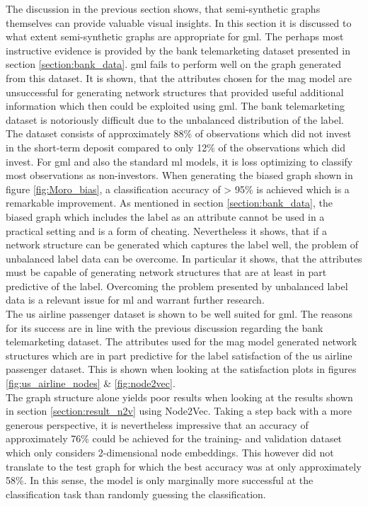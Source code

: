  The discussion in the previous section shows, that semi-synthetic graphs
  themselves can provide valuable visual insights. In this section it is
  discussed to what extent semi-synthetic graphs are appropriate for \acs{gml}. 
  The perhaps most instructive evidence is provided by the bank telemarketing 
  dataset presented in section \ref{section:bank_data}. \acs{gml} fails to 
  perform well on the graph generated from this dataset. It is shown, that the 
  attributes chosen for the \acs{mag} model are unsuccessful for generating 
  network structures that provided useful additional information which then 
  could be exploited using \acs{gml}. The bank telemarketing dataset is 
  notoriously difficult due to the unbalanced distribution of the label. The 
  dataset consists of approximately 88\% of observations which did not invest 
  in the short-term deposit compared to only 12\% of the observations which did 
  invest. For \acs{gml} and also the standard \acs{ml} models, it is loss 
  optimizing to classify most observations as non-investors. When generating 
  the biased graph shown in figure \ref{fig:Moro_bias}, a classification 
  accuracy of > 95\% is achieved which is a remarkable improvement. As 
  mentioned in section \ref{section:bank_data}, the biased graph which includes 
  the label as an attribute cannot be used in a practical setting and is a form of
  cheating. Nevertheless it shows, that if a network structure can be generated
  which captures the label well, the problem of unbalanced label data can be
  overcome. In particular it shows, that the attributes must be capable of
  generating network structures that are at least in part predictive of the
  label. Overcoming the problem presented by unbalanced label data is a relevant 
  issue for \acs{ml} and warrant further research. \\

  \noindent The \acs{us} airline passenger dataset is shown to be well suited for 
  \acs{gml}. The reasons for its success are in line with the previous 
  discussion regarding the bank telemarketing dataset. The attributes used for 
  the \acs{mag} model generated network structures which are in part predictive 
  for the label satisfaction of the \acs{us} airline passenger dataset. This is 
  shown when looking at the satisfaction plots in figures 
  \ref{fig:us_airline_nodes} \& \ref{fig:node2vec}. \\ 

  \noindent The graph structure alone yields poor results when looking at the 
  results shown in section \ref{section:result_n2v} using Node2Vec. Taking a 
  step back with a more generous perspective, it is nevertheless impressive that 
  an accuracy of approximately 76\% could be achieved for the training- and 
  validation dataset which only considers 2-dimensional node embeddings. This 
  however did not translate to the test graph for which the best accuracy was at 
  only approximately 58\%. In this sense, the model is only marginally more 
  successful at the classification task than randomly guessing the 
  classification. \\

